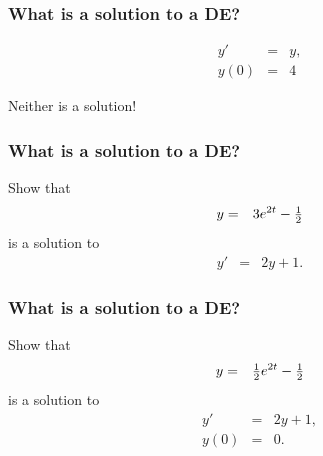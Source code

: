 \begin{frame}
  \frametitle{What is a solution to a DE?}

  \begin{eqnarray*}
    y' & = & y, \\
    y(0) & = & 4
  \end{eqnarray*}

  Neither is a solution! 


\end{frame}


\begin{frame}
  \frametitle{What is a solution to a DE?}

  Show that 
  \begin{eqnarray*}
    y & = & 3 e^{2t} - \mbox{$\frac{1}{2}$}
  \end{eqnarray*}
  is a solution to
  \begin{eqnarray*}
    y' & = & 2y + 1.
  \end{eqnarray*}



\end{frame}


\begin{frame}
  \frametitle{What is a solution to a DE?}

  Show that 
  \begin{eqnarray*}
    y & = & \mbox{$\frac{1}{2}$} e^{2t} - \mbox{$\frac{1}{2}$}
  \end{eqnarray*}
  is a solution to
  \begin{eqnarray*}
    y' & = & 2y + 1, \\
    y(0) & = & 0.
  \end{eqnarray*}




\end{frame}


